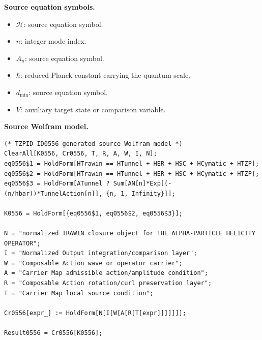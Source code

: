 \begin{minipage}[t]{0.49\linewidth}
\begingroup
\small
\raggedright
\textbf{Source equation symbols.}\par
\begin{itemize}[leftmargin=1.35em,itemsep=1pt,topsep=1pt,parsep=0pt]
    \item $\mathcal{H}$: source equation symbol.
    \item $n$: integer mode index.
    \item $A_n$: source equation symbol.
    \item $\hbar$: reduced Planck constant carrying the quantum scale.
    \item $d_{\min}$: source equation symbol.
    \item $V$: auxiliary target state or comparison variable.
\end{itemize}
\endgroup
\end{minipage}\hfill
\begin{minipage}[t]{0.47\linewidth}
\begingroup
\scriptsize
\raggedright
\textbf{Source Wolfram model.}\par
\begin{Verbatim}[fontsize=\tiny,breaklines=true,breakanywhere=true]
(* TZPID ID0556 generated source Wolfram model *)
ClearAll[K0556, Cr0556, T, R, A, W, I, N];
eq0556$1 = HoldForm[HTrawin == HTunnel + HER + HSC + HCymatic + HTZP];
eq0556$2 = HoldForm[HTrawin == HTunnel + HER + HSC + HCymatic + HTZP];
eq0556$3 = HoldForm[ATunnel ? Sum[AN[n]*Exp[(-(n/hbar))*TunnelAction[n]], {n, 1, Infinity}]];

K0556 = HoldForm[{eq0556$1, eq0556$2, eq0556$3}];

N = "normalized TRAWIN closure object for THE ALPHA-PARTICLE HELICITY OPERATOR";
I = "Normalized Output integration/comparison layer";
W = "Composable Action wave or operator carrier";
A = "Carrier Map admissible action/amplitude condition";
R = "Composable Action rotation/curl preservation layer";
T = "Carrier Map local source condition";

Cr0556[expr_] := HoldForm[N[I[W[A[R[T[expr]]]]]]];

Result0556 = Cr0556[K0556];
\end{Verbatim}
\endgroup
\end{minipage}

